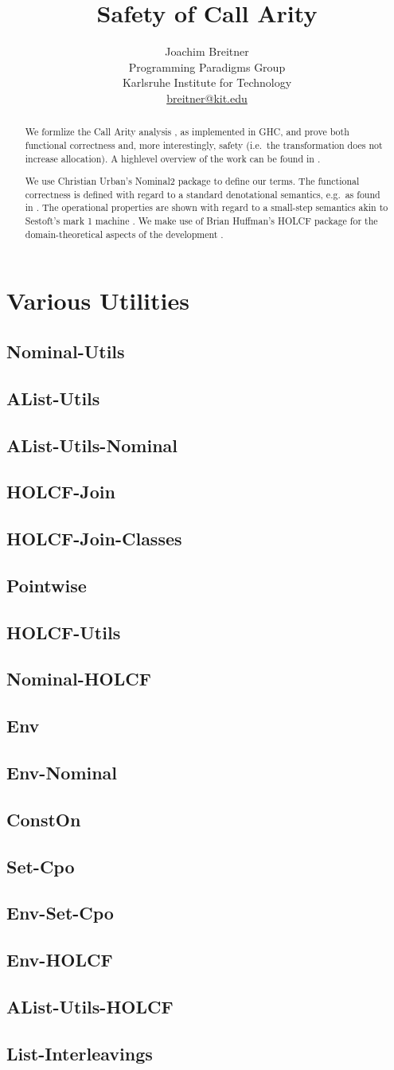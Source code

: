 \documentclass[11pt,a4paper,parskip=half]{scrartcl}
\begin{document}
\title{Safety of Call Arity}
\author{Joachim Breitner\\
Programming Paradigms Group\\
Karlsruhe Institute for Technology\\
\url{breitner@kit.edu}}
\maketitle


\begin{abstract}
We formlize the Call Arity analysis \cite{tfp}, as implemented in GHC, and prove both functional correctness and, more interestingly, safety (i.e.\ the transformation does not increase allocation). A highlevel overview of the work can be found in \cite{icfp15}.

We use Christian Urban's Nominal2 package \cite{nominal} to define our terms. The functional correctness is defined with regard to a standard denotational semantics, e.g.\ as found in \cite{launchbury}. The operational properties are shown with regard to a small-step semantics akin to Sestoft's mark 1 machine \cite{sestoft}.  We make use of Brian Huffman's HOLCF package for the domain-theoretical aspects of the development \cite{holcf}.

\end{abstract}

\tableofcontents

\newcommand{\theory}[1]{\subsection{#1}\label{sec_#1}}




\section{Various Utilities}

\theory{Nominal-Utils}
\theory{AList-Utils}
\theory{AList-Utils-Nominal}
\theory{HOLCF-Join}
\theory{HOLCF-Join-Classes}
\theory{Pointwise}
\theory{HOLCF-Utils}
\theory{Nominal-HOLCF}
\theory{Env}
\theory{Env-Nominal}
\theory{ConstOn}
\theory{Set-Cpo}
\theory{Env-Set-Cpo}
\theory{Env-HOLCF}
\theory{AList-Utils-HOLCF}
\theory{List-Interleavings}
\end{document}
